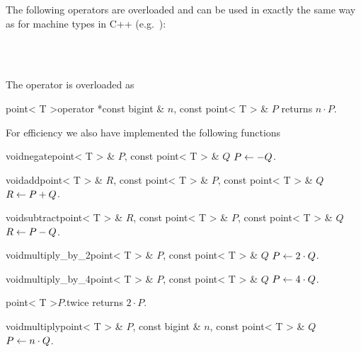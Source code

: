 
\ARTH

The following operators are overloaded and can be used in exactly the same way as for machine
types in C++ (e.g.~):
\begin{center}
   \\
   \\
\end {center}
The \code{*} operator is overloaded as

\begin{fcode}{point< T >}{operator *}{const bigint & $n$, const point< T > & $P$}
  returns $n \cdot P$.
\end{fcode}

For efficiency we also have implemented the following functions

\begin{fcode}{void}{negate}{point< T > & $P$, const point< T > & $Q$}
  $P \leftarrow -Q$.
\end{fcode}

\begin{fcode}{void}{add}{point< T > & $R$, const point< T > & $P$, const point< T > & $Q$}
  $R \leftarrow P + Q$.
\end{fcode}

\begin{fcode}{void}{subtract}{point< T > & $R$, const point< T > & $P$, const point< T > & $Q$}
  $R \leftarrow P - Q$.
\end{fcode}

\begin{fcode}{void}{multiply_by_2}{point< T > & $P$, const point< T > & $Q$}
  $P \leftarrow 2 \cdot Q$.
\end{fcode}

\begin{fcode}{void}{multiply_by_4}{point< T > & $P$, const point< T > & $Q$}
  $P \leftarrow 4 \cdot Q$.
\end{fcode}

\begin{cfcode}{point< T >}{$P$.twice}{}
  returns $2 \cdot P$.
\end{cfcode}

\begin{fcode}{void}{multiply}{point< T > & $P$, const bigint & $n$, const point< T > & $Q$}
  $P \leftarrow n \cdot Q$.
\end{fcode}


